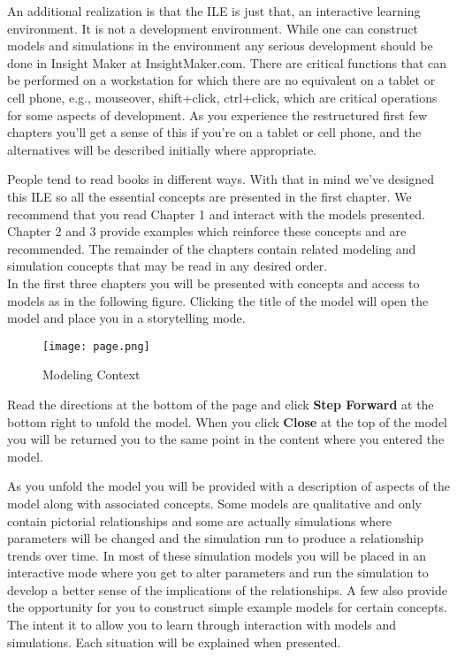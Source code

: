 \documentclass[]{memoir}
\let\Oldincludegraphics\includegraphics
\renewcommand{\includegraphics}[1]{\Oldincludegraphics[max size={\textwidth}{\textheight}]{#1}}
\begin{document}
An additional realization is that the ILE is just that, an interactive
learning environment. It is not a development environment. While one can
construct models and simulations in the environment any serious
development should be done in Insight Maker at InsightMaker.com. There
are critical functions that can be performed on a workstation for which
there are no equivalent on a tablet or cell phone, e.g., mouseover,
shift+click, ctrl+click, which are critical operations for some aspects
of development. As you experience the restructured first few chapters
you'll get a sense of this if you're on a tablet or cell phone, and the
alternatives will be described initially where appropriate.

People tend to read books in different ways. With that in mind we've
designed this ILE so all the essential concepts are presented in the
first chapter. We recommend that you read Chapter 1 and interact with
the models presented. Chapter 2 and 3 provide examples which reinforce
these concepts and are recommended. The remainder of the chapters
contain related modeling and simulation concepts that may be read in any
desired order.\\ In the first three chapters you will be presented with
concepts and access to models as in the following figure. Clicking the
title of the model will open the model and place you in a storytelling
mode.

\begin{figure}[htbp]
\centering
\texttt{[image: page.png]}
\caption{Modeling Context}
\end{figure}

Read the directions at the bottom of the page and click \textbf{Step
Forward} at the bottom right to unfold the model. When you click
\textbf{Close} at the top of the model you will be returned you to the
same point in the content where you entered the model.

As you unfold the model you will be provided with a description of
aspects of the model along with associated concepts. Some models are
qualitative and only contain pictorial relationships and some are
actually simulations where parameters will be changed and the simulation
run to produce a relationship trends over time. In most of these
simulation models you will be placed in an interactive mode where you
get to alter parameters and run the simulation to develop a better sense
of the implications of the relationships. A few also provide the
opportunity for you to construct simple example models for certain
concepts. The intent it to allow you to learn through interaction with
models and simulations. Each situation will be explained when presented.
\end{document}

